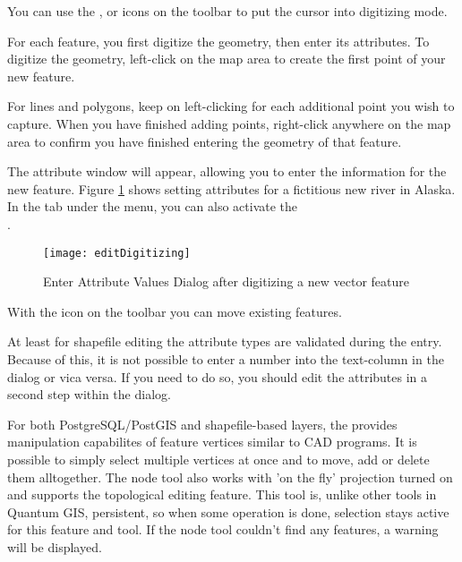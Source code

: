 
You can use the ,
 or
 icons on the toolbar to
put the \qg cursor into digitizing mode.

For each feature, you first digitize the geometry, then enter its attributes.
To digitize the geometry, left-click on the map area to create the first
point of your new feature.

For lines and polygons, keep on left-clicking for each additional
point you wish to capture.  When you have finished adding points,
right-click anywhere on the map area to confirm you have finished entering
the geometry of that feature.

The attribute window will appear, allowing you to enter the information for
the new feature. Figure \ref{fig:vector_digitising} shows setting attributes
for a fictitious new river in Alaska. In the  tab under the
 \arrow {} menu, you can also activate the
\\
.

\begin{figure}[ht]
   \centering
   \texttt{[image: editDigitizing]}
   \caption{Enter Attribute Values Dialog after digitizing a new vector feature \nixcaption}\label{fig:vector_digitising}
 \end{figure}

With the  icon on the toolbar
you can move existing features.

\begin{Tip}\caption{\textsc{Attribute Value Types}}
At least for shapefile editing the attribute types are validated during the
entry. Because of this, it is not possible to enter a number into the text-column in
the dialog  or vica versa. If you need to do so,
you should edit the attributes in a second step within the  dialog.
\end{Tip}


For both PostgreSQL/PostGIS and shapefile-based layers, the
 provides manipulation capabilites
of feature vertices similar to CAD programs. It is possible to simply select
multiple vertices at once and to move, add or delete them alltogether. The node
tool also works with 'on the fly' projection turned on and supports
the topological editing feature. This tool is, unlike other tools in Quantum GIS,
persistent, so when some operation is done, selection stays active for this
feature and tool. If the node tool couldn't find any features, a warning will be
displayed.

